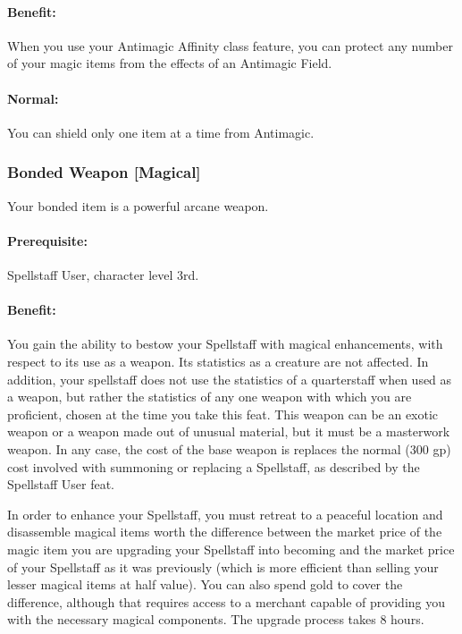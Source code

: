 \paragraph{Benefit:} When you use your Antimagic Affinity class feature, you can protect any number of your magic items from the effects of an Antimagic Field.
\paragraph{Normal:} You can shield only one item at a time from Antimagic.

\subsubsection[Bonded Weapon]{Bonded Weapon [Magical]}
\label{Feat:BondedWeapon}
Your bonded item is a powerful arcane weapon.
 
\paragraph{Prerequisite:} Spellstaff User, character level 3rd.
 
\paragraph{Benefit:} You gain the ability to bestow your Spellstaff with magical enhancements, with respect to its use as a weapon. Its statistics as a creature are not affected. 
In addition, your spellstaff does not use the statistics of a quarterstaff when used as a weapon, but rather the statistics of any one weapon with which you are proficient, chosen at the time you take this feat.
This weapon can be an exotic weapon or a weapon made out of unusual material, but it must be a masterwork weapon. 
In any case, the cost of the base weapon is replaces the normal (300 gp) cost involved with summoning or replacing a Spellstaff, as described by the Spellstaff User feat.

In order to enhance your Spellstaff, you must retreat to a peaceful location and disassemble magical items worth the difference between the market price of the magic item you are upgrading your Spellstaff into becoming and the market price of your Spellstaff as it was previously (which is more efficient than selling your lesser magical items at half value).
You can also spend gold to cover the difference, although that requires access to a merchant capable of providing you with the necessary magical components.
The upgrade process takes 8 hours.%

